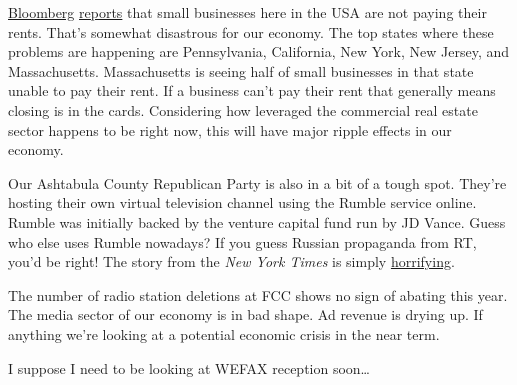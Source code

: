 \href{https://archive.ph/1zraL}{Bloomberg}
\href{https://www.bloomberg.com/news/articles/2022-10-31/us-small-business-rent-delinquency-rates-rise-sharply-in-october}{reports}
that small businesses here in the USA are not paying their rents. That's
somewhat disastrous for our economy. The top states where these problems
are happening are Pennsylvania, California, New York, New Jersey, and
Massachusetts. Massachusetts is seeing half of small businesses in that
state unable to pay their rent. If a business can't pay their rent that
generally means closing is in the cards. Considering how leveraged the
commercial real estate sector happens to be right now, this will have
major ripple effects in our economy.

Our Ashtabula County Republican Party is also in a bit of a tough spot.
They're hosting their own virtual television channel using the Rumble
service online. Rumble was initially backed by the venture capital fund
run by JD Vance. Guess who else uses Rumble nowadays? If you guess
Russian propaganda from RT, you'd be right! The story from the \emph{New
York Times} is simply \href{https://archive.ph/cUXki}{horrifying}.

The number of radio station deletions at FCC shows no sign of abating
this year. The media sector of our economy is in bad shape. Ad revenue
is drying up. If anything we're looking at a potential economic crisis
in the near term.

I suppose I need to be looking at WEFAX reception soon\ldots{}

